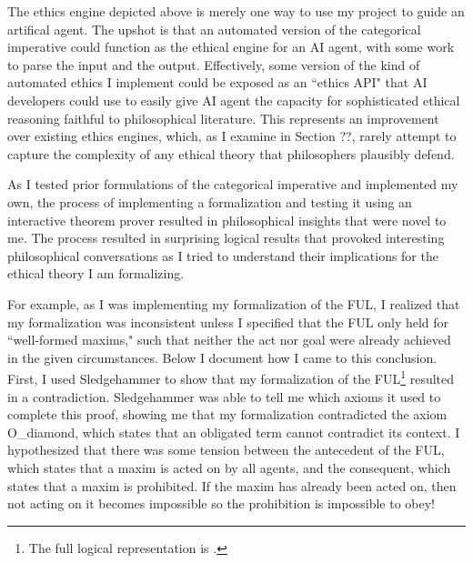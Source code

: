 \begin{isabellebody}
\begin{isamarkuptext}
The ethics engine depicted above is merely one way to use my project to guide an artifical agent. The 
upshot is that an automated version of the categorical imperative could function as the ethical engine 
for an AI agent, with some work to parse the input and the output. Effectively, some version of the kind 
of automated ethics I implement could be 
exposed as an ``ethics API" that AI developers could use to easily give AI agent the capacity for 
sophisticated ethical reasoning faithful to philosophical literature. This represents an improvement 
over existing ethics engines, which, as I examine in Section ??, rarely attempt to capture the complexity 
of any ethical theory that philosophers plausibly defend.%
\end{isamarkuptext}\isamarkuptrue%
%
\isadelimdocument
%
\endisadelimdocument
%
\isatagdocument
%
\isamarkuptrue%
%
\isamarkuptrue%
%
\endisatagdocument
{\isafolddocument}%
%
\isadelimdocument
%
\endisadelimdocument
%
\begin{isamarkuptext}%
As I tested prior formulations of the categorical imperative and implemented my own, the process 
of implementing a formalization and testing it using an interactive theorem prover resulted in philosophical 
insights that were novel to me. The process resulted in surprising logical results that provoked 
interesting philosophical conversations as I tried to understand their implications for the ethical 
theory I am formalizing. 

For example, as I was implementing my formalization of the FUL, I realized
that my formalization was inconsistent unless I specified that the FUL only held for ``well-formed maxims,"
such that neither the act nor goal were already achieved in the given circumstances. Below I document how 
I came to this conclusion. First, I used Sledgehammer to show that my formalization of the FUL\footnote{The full logical representation is .}
resulted in a contradiction. Sledgehammer was able to tell me which axioms it used to complete 
this proof, showing me that my formalization contradicted the axiom O\_diamond, which states that an 
obligated term cannot contradict its context. I hypothesized that there was some tension between 
the antecedent of the FUL, which states that a maxim is acted on by all agents, and the consequent, 
which states that a maxim is prohibited. If the maxim has already been acted on, then not acting on it
becomes impossible so the prohibition is impossible to obey! 


\end{isamarkuptext}
\end{isabellebody}
